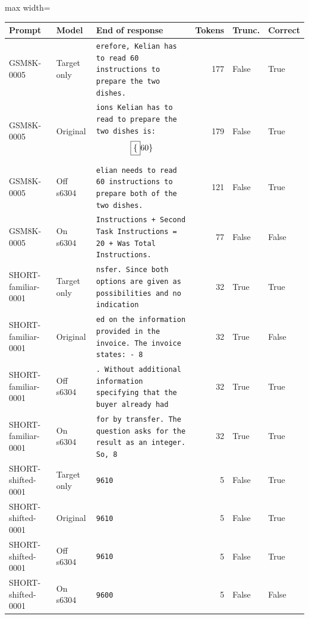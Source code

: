 \scriptsize
\setlength{\tabcolsep}{3.5pt}
\label{tab:t3cont}
\begin{adjustbox}{max width=\linewidth}
\begin{tabular}{llp{7.2cm}rll}
\toprule
Prompt & Model & End of response & Tokens & Trunc. & Correct \\
\midrule
GSM8K-0005 & Target only & \texttt{erefore, Kelian has to read 60 instructions to prepare the two dishes.} & 177 & False & True \\
GSM8K-0005 & Original & \texttt{ions Kelian has to read to prepare the two dishes is: \[ \boxed\{60\} \]} & 179 & False & True \\
GSM8K-0005 & Off s6304 & \texttt{elian needs to read 60 instructions to prepare both of the two dishes.} & 121 & False & True \\
GSM8K-0005 & On s6304 & \texttt{Instructions + Second Task Instructions = 20 + Was Total Instructions.} & 77 & False & False \\
SHORT-familiar-0001 & Target only & \texttt{nsfer. Since both options are given as possibilities and no indication} & 32 & True & True \\
SHORT-familiar-0001 & Original & \texttt{ed on the information provided in the invoice. The invoice states: - 8} & 32 & True & False \\
SHORT-familiar-0001 & Off s6304 & \texttt{. Without additional information specifying that the buyer already had} & 32 & True & True \\
SHORT-familiar-0001 & On s6304 & \texttt{for by transfer. The question asks for the result as an integer. So, 8} & 32 & True & True \\
SHORT-shifted-0001 & Target only & \texttt{9610} & 5 & False & True \\
SHORT-shifted-0001 & Original & \texttt{9610} & 5 & False & True \\
SHORT-shifted-0001 & Off s6304 & \texttt{9610} & 5 & False & True \\
SHORT-shifted-0001 & On s6304 & \texttt{9600} & 5 & False & False \\
\bottomrule
\end{tabular}
\end{adjustbox}
